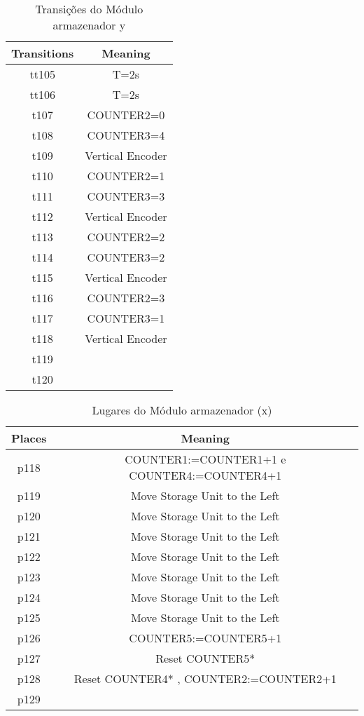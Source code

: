 \begin{table}[htbp]
\caption{Transições do Módulo armazenador y}
\centering
\begin{tabular}{c|c}
Transitions & Meaning\\
\hline
tt105 & T=2s\\
tt106 & T=2s\\
t107 & COUNTER2=0\\
t108 & COUNTER3=4\\
t109 & Vertical Encoder\\
t110 & COUNTER2=1\\
t111 & COUNTER3=3\\
t112 & Vertical Encoder\\
t113 & COUNTER2=2\\
t114 & COUNTER3=2\\
t115 & Vertical Encoder\\
t116 & COUNTER2=3\\
t117 & COUNTER3=1\\
t118 & Vertical Encoder\\
t119 & \\
t120 & \\
\end{tabular}
\end{table}
\begin{table}[htbp]
\caption{Lugares do Módulo armazenador (x)}
\centering
\begin{tabular}{c|c}
Places & Meaning\\
\hline
p118 & COUNTER1:=COUNTER1+1 e COUNTER4:=COUNTER4+1\\
p119 & Move Storage Unit to the Left\\
p120 & Move Storage Unit to the Left\\
p121 & Move Storage Unit to the Left\\
p122 & Move Storage Unit to the Left\\
p123 & Move Storage Unit to the Left\\
p124 & Move Storage Unit to the Left\\
p125 & Move Storage Unit to the Left\\
p126 & COUNTER5:=COUNTER5+1\\
p127 & Reset COUNTER5*\\
p128 & Reset COUNTER4* , COUNTER2:=COUNTER2+1\\
p129 & \\
\end{tabular}
\end{table}

